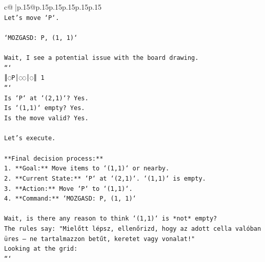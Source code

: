 \documentclass{article}
\begin{document}
{\begin{supertabular}{c@{$\;$}|p{.15\linewidth}@{}p{.15\linewidth}p{.15\linewidth}p{.15\linewidth}p{.15\linewidth}p{.15\linewidth}}
{{{\\ 
\texttt{Let's move `P`.} \\
\\ 
\texttt{`MOZGASD: P, (1, 1)`} \\
\\ 
\texttt{Wait, I see a potential issue with the board drawing.} \\
\texttt{```} \\
\texttt{║◌P│◌◌│◌║ 1} \\
\texttt{```} \\
\texttt{Is `P` at `(2,1)`? Yes.} \\
\texttt{Is `(1,1)` empty? Yes.} \\
\texttt{Is the move valid? Yes.} \\
\\ 
\texttt{Let's execute.} \\
\\ 
\texttt{**Final decision process:**} \\
\texttt{1.  **Goal:** Move items to `(1,1)` or nearby.} \\
\texttt{2.  **Current State:** `P` at `(2,1)`. `(1,1)` is empty.} \\
\texttt{3.  **Action:** Move `P` to `(1,1)`.} \\
\texttt{4.  **Command:** `MOZGASD: P, (1, 1)`} \\
\\ 
\texttt{Wait, is there any reason to think `(1,1)` is *not* empty?} \\
\texttt{The rules say: "Mielőtt lépsz, ellenőrizd, hogy az adott cella valóban üres – ne tartalmazzon betűt, keretet vagy vonalat!"} \\
\texttt{Looking at the grid:} \\
\texttt{```} \\
            }
        }
    }
     \\ \\


\end{supertabular}}
\end{document}
